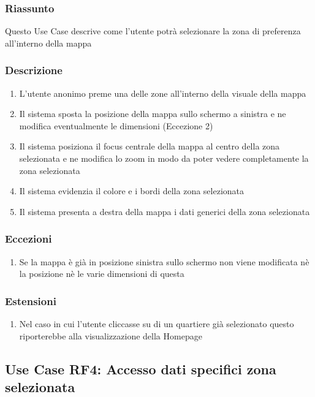         \subsubsection{Riassunto}
            Questo Use Case descrive come l'utente potrà selezionare la zona di preferenza all'interno della mappa
        \subsubsection{Descrizione}
            \begin{enumerate}
                \item L'utente anonimo preme una delle zone all'interno della visuale della mappa
                \item Il sistema sposta la posizione della mappa sullo schermo a sinistra e ne modifica eventualmente le dimensioni (Eccezione 2)
                \item Il sistema posiziona il focus centrale della mappa al centro della zona selezionata e ne modifica lo zoom in modo da poter vedere completamente la zona selezionata
                \item Il sistema evidenzia il colore e i bordi della zona selezionata
                \item Il sistema presenta a destra della mappa i dati generici della zona selezionata
            \end{enumerate}
        \subsubsection{Eccezioni}
            \begin{enumerate}
                \item Se la mappa è già in posizione sinistra sullo schermo non viene modificata nè la posizione nè le varie dimensioni di questa
            \end{enumerate}
        \subsubsection{Estensioni}
            \begin{enumerate}
                \item Nel caso in cui l'utente cliccasse su di un quartiere già selezionato questo riporterebbe alla visualizzazione della Homepage
            \end{enumerate}

    \subsection{Use Case RF4: Accesso dati specifici zona selezionata}
